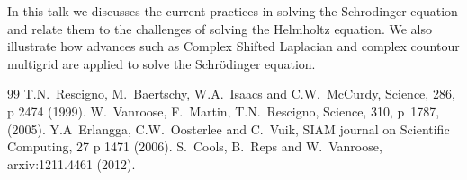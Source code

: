 \documentclass{report}
\begin{document}
In this talk we discusses the current practices in solving the
Schrodinger equation \cite{c2,c3} and relate them to the challenges of
solving the Helmholtz equation. We also illustrate how advances such
as Complex Shifted Laplacian \cite{c5} and complex countour multigrid
\cite{c1} are applied to solve the Schr\"odinger equation.


\begin{thebibliography}{99}
T.N.~Rescigno, M.~Baertschy, W.A.~Isaacs and C.W.~McCurdy,
Science, 286, p 2474 (1999).
W.~Vanroose, F.~Martin, T.N.~Rescigno, Science, 310, p~1787, (2005).
Y.A~Erlangga, C.W.~Oosterlee and C.~Vuik, SIAM journal on Scientific
Computing, 27 p 1471 (2006).
S.~Cools, B.~Reps and W.~Vanroose, arxiv:1211.4461 (2012).
\end{thebibliography}
\end{document}
